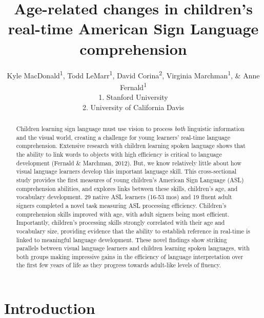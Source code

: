 \documentclass[12pt,]{article}
\title{Age-related changes in children's real-time American Sign Language
comprehension}
\author{Kyle MacDonald\textsuperscript{1}, Todd LeMarr\textsuperscript{1}, David
Corina\textsuperscript{2}, Virginia Marchman\textsuperscript{1}, \& Anne
Fernald\textsuperscript{1}\\1. Stanford University\\2. University of
California Davis}
\date{}
\begin{document}
\maketitle

\begin{abstract}
Children learning sign language must use vision to process \emph{both}
linguistic information and the visual world, creating a challenge for
young learners' real-time language comprehension. Extensive research
with children learning spoken language shows that the ability to link
words to objects with high efficiency is critical to language
development (Fernald \& Marchman, 2012). But, we know relatively little
about how visual language learners develop this important language
skill. This cross-sectional study provides the first measures of young
children's American Sign Language (ASL) comprehension abilities, and
explores links between these skills, children's age, and vocabulary
development. 29 native ASL learners (16-53 mos) and 19 fluent adult
signers completed a novel task measuring ASL processing efficiency.
Children's comprehension skills improved with age, with adult signers
being most efficient. Importantly, children's processing skills strongly
correlated with their age and vocabulary size, providing evidence that
the ability to establish reference in real-time is linked to meaningful
language development. These novel findings show striking parallels
between visual language learners and children learning spoken languages,
with both groups making impressive gains in the efficiency of language
interpretation over the first few years of life as they progress towards
adult-like levels of fluency.
\end{abstract}

\newpage

\section{Introduction}\label{introduction}
\end{document}
